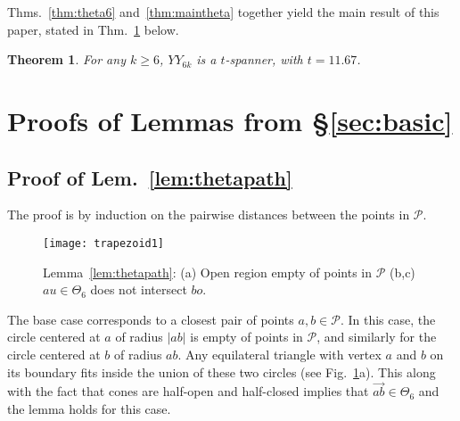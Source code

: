 \documentclass[11pt]{article}
\newcommand\Pt{\mathcal P}
\newcommand{\arr}[1]{\overrightarrow{#1}}
\newtheorem{theorem}{{\bf Theorem}}
\begin{document}
\medskip
\noindent
Thms.~\ref{thm:theta6} and~\ref{thm:maintheta} together yield the main result of this paper, stated in Thm.~\ref{thm:main} below.
\begin{theorem}
For any $k \ge 6$, $YY_{6k}$ is a $t$-spanner, with $t = 11.67$.
\label{thm:main}
\end{theorem}

\section{Proofs of Lemmas from \S\ref{sec:basic}}
\label{sec:proofs}

\subsection{Proof of Lem.~\ref{lem:thetapath}}
The proof is by induction on the pairwise distances between the points in $\Pt$.
\begin{figure}[htpb]
\centering
\texttt{[image: trapezoid1]}
\caption{Lemma~\ref{lem:thetapath}: (a) Open region empty of points in $\Pt$ (b,c) $au \in \Theta_6$ does not intersect $bo$.}
\label{fig:trapezoid1}
\end{figure}
The base case corresponds to a closest pair of points $a, b \in \Pt$. In this case, the circle centered at $a$ of radius $|ab|$ is empty of points in $\Pt$, and similarly for the circle centered at $b$ of radius $ab$. Any equilateral triangle with vertex $a$ and $b$ on its boundary fits inside the union of these two circles (see Fig.~\ref{fig:trapezoid1}a). This along with the fact that cones are half-open and half-closed implies that $\arr{ab} \in \Theta_6$ and the lemma holds for this case.
\end{document}

